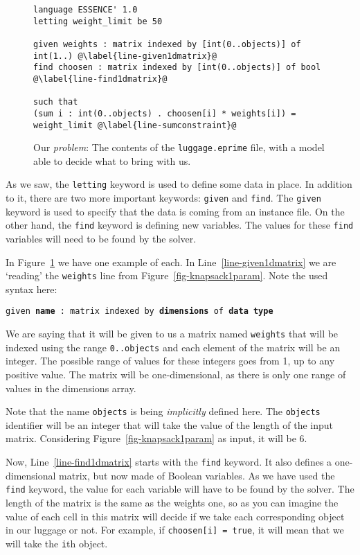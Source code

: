 \begin{figure}
\begin{lstlisting}
language ESSENCE' 1.0
letting weight_limit be 50

given weights : matrix indexed by [int(0..objects)] of int(1..) @\label{line-given1dmatrix}@
find choosen : matrix indexed by [int(0..objects)] of bool @\label{line-find1dmatrix}@

such that
(sum i : int(0..objects) . choosen[i] * weights[i]) = weight_limit @\label{line-sumconstraint}@
\end{lstlisting}
    \caption{Our \emph{problem}: The contents of the \texttt{luggage.eprime}
    file, with a model able to decide what to bring with us.}
\label{fig-knapsack1}
\end{figure}

As we saw, the \texttt{letting} keyword is used to define some data in place.
In addition to it, there are two more important keywords: \texttt{given} and
\texttt{find}. The \texttt{given} keyword is used to specify that the data is
coming from an instance file. On the other hand, the \texttt{find} keyword is
defining new variables. The values for these \texttt{find} variables will need
to be found by the solver. 

In Figure~\ref{fig-knapsack1} we have one example of each. In
Line~\ref{line-given1dmatrix} we are `reading' the \texttt{weights} line from
Figure~\ref{fig-knapsack1param}. Note the used syntax here:

\texttt{given \textbf{name} : matrix indexed by \textbf{dimensions} of \textbf{data type}}

We are saying that it will be given to us a matrix named \texttt{weights} that
will be indexed using the range \texttt{0..objects} and each element of the
matrix will be an integer. The possible range of values for these integers goes
from 1, up to any positive value. The matrix will be one-dimensional, as there
is only one range of values in the dimensions array.

Note that the name \texttt{objects} is being \emph{implicitly} defined here. The
\texttt{objects} identifier will be an integer that will take the value of the
length of the input matrix. Considering Figure~\ref{fig-knapsack1param} as
input, it will be 6.

Now, Line~\ref{line-find1dmatrix} starts with the \texttt{find} keyword. It
also defines a one-dimensional matrix, but now made of Boolean variables. As we
have used the \texttt{find} keyword, the value for each variable will have to
be found by the solver. 
The length of the matrix is the same as the weights one, so as you can imagine
the value of each cell in this matrix will decide if we take each corresponding
object in our luggage or not. For example, if \texttt{choosen[i] = true}, it
will mean that we will take the \texttt{i}th object.


